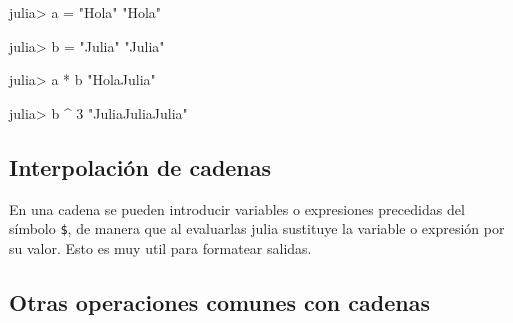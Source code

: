 \documentclass[
  letterpaper,
  DIV=11,
  numbers=noendperiod]{scrreprt}
\newenvironment{Shaded}{\begin{snugshade}}{\end{snugshade}}
\newcommand{\FloatTok}[1]{\textcolor[rgb]{0.68,0.00,0.00}{#1}}
\newcommand{\NormalTok}[1]{\textcolor[rgb]{0.00,0.23,0.31}{#1}}
\newcommand{\OperatorTok}[1]{\textcolor[rgb]{0.37,0.37,0.37}{#1}}
\newcommand{\SpecialCharTok}[1]{\textcolor[rgb]{0.37,0.37,0.37}{#1}}
\newcommand{\StringTok}[1]{\textcolor[rgb]{0.13,0.47,0.30}{#1}}
\begin{document}
\begin{Shaded}
\begin{Highlighting}[]
\NormalTok{julia}\OperatorTok{\textgreater{}}\NormalTok{ a }\OperatorTok{=} \StringTok{"Hola"}
\StringTok{"Hola"}

\NormalTok{julia}\OperatorTok{\textgreater{}}\NormalTok{ b }\OperatorTok{=} \StringTok{"Julia"}
\StringTok{"Julia"}

\NormalTok{julia}\OperatorTok{\textgreater{}}\NormalTok{ a }\OperatorTok{*}\NormalTok{ b}
\StringTok{"HolaJulia"}

\NormalTok{julia}\OperatorTok{\textgreater{}}\NormalTok{ b }\OperatorTok{\^{}} \FloatTok{3}
\StringTok{"JuliaJuliaJulia"}
\end{Highlighting}
\end{Shaded}

\hypertarget{interpolaciuxf3n-de-cadenas}{%
\subsection{Interpolación de
cadenas}\label{interpolaciuxf3n-de-cadenas}}

En una cadena se pueden introducir variables o expresiones precedidas
del símbolo \texttt{\$}, de manera que al evaluarlas julia sustituye la
variable o expresión por su valor. Esto es muy util para formatear
salidas.

\begin{Shaded}
\end{Shaded}

\hypertarget{otras-operaciones-comunes-con-cadenas}{%
\subsection{Otras operaciones comunes con
cadenas}\label{otras-operaciones-comunes-con-cadenas}}
\end{document}
